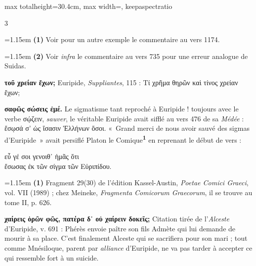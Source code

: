 \documentclass[11pt,twoside]{book}
\newcommand{\italique}[1]{\textit{#1}}
\newcommand{\citComm}[1]{\begin{quoting}[vskip=0.4pt,leftmargin=0.7em,rightmargin=0.2em]#1\end{quoting}}
\newcommand{\marqueur}[1]{\textsuperscript{\color{rubricRed}\textbf{#1}}}
\begin{document}
\begin{adjustbox}{max totalheight=30.4cm, max width=\textwidth, keepaspectratio}
\begin{minipage}{\textwidth}
{\begin{multicols}{3}
\par\vspace{1.5pt}
\noindent\hangindent=1.15em {\color{sepiaNote}\textbf{(1)}} Voir pour un autre exemple le commentaire au vers 1174.
\par\vspace{1.5pt}
\noindent\hangindent=1.15em {\color{sepiaNote}\textbf{(2)}} Voir \italique{infra} le commentaire au vers 735 pour une erreur analogue de Suidas.
\par\vspace{1.5pt}
 \textbf{τοῦ χρείαν ἔχων;} Euripide, \italique{Suppliantes}, 115 : Τί χρῆμα θηρῶν καὶ τίνος χρείαν ἔχων;
\par\vspace{1.5pt}
 \textbf{σαφῶς σώσεις ἐμέ.} Le sigmatisme tant reproché à Euripide ! toujours avec le verbe σῴζειν, \italique{sauver}, le véritable Euripide avait sifflé au vers 476 de sa \italique{Médée} : ἔσῳσά σ' ὡς ἴσασιν Ἑλλήνων ὅσοι. «~Grand merci de nous avoir sauvé des sigmas d'Euripide~» avait persiflé Platon le Comique\marqueur{1} en reprenant le début de vers :
\citComm{εὖ γέ σοι γενοιθ᾽ ἡμᾶς ὅτι\\
ἔσωσας ἐκ τῶν σίγμα τῶν Εὐριπίδου.}
\par\vspace{1.5pt}
\par\vspace{1.2pt}\par\nopagebreak\vspace{1pt}\noindent\hangindent=1.15em {\color{sepiaNote}\textbf{(1)}} Fragment 29(30) de l'édition Kassel-Austin, \italique{Poetae Comici Graeci}, vol. VII (1989) ; chez Meineke, \italique{Fragmenta Comicorum Graecorum}, il se trouve au tome II, p. 626.
\par\vspace{1.5pt}
 \textbf{χαίρεις ὁρῶν φῶς, πατέρα δ᾽ οὐ χαίρειν δοκεῖς;} Citation tirée de l'\italique{Alceste} d'Euripide, v. 691 : Phérès envoie paître son fils Admète qui lui demande de mourir à sa place. C'est finalement Alceste qui se sacrifiera pour son mari ; tout comme Mnésiloque, parent par \italique{alliance} d'Euripide, ne va pas tarder à accepter ce qui ressemble fort à un suicide.
\par\vspace{1.5pt}

\end{multicols}}
\end{minipage}
\end{adjustbox}
\end{document}
